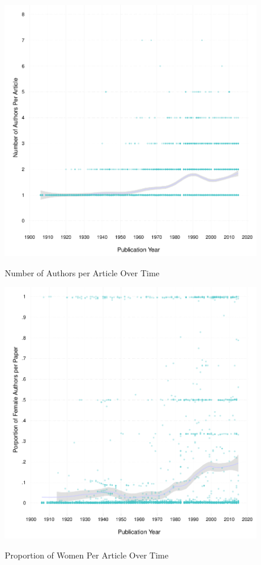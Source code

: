 \documentclass[12pt]{article}
\begin{document}
\begin{figure}[htbp]
\centering
\caption{Number of Authors per Article Over Time}
\includegraphics[scale=.85]{../figs/n_authors_per_article_over_time.pdf}
\label{fig:nauthors}
\end{figure}

\begin{figure}[htbp]
\centering
\caption{Proportion of Women Per Article Over Time}
\includegraphics[scale=.85]{../figs/gender_authors_per_article_over_time.pdf}
\label{fig:women}
\end{figure}
\end{document}

